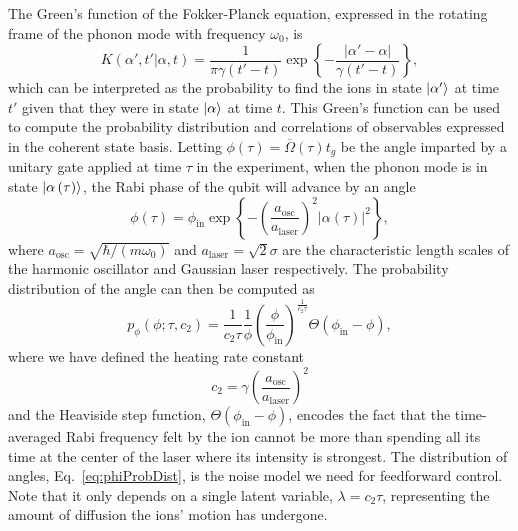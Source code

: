 \documentclass[prx,aps,twocolumn,showpacs,superscriptaddress,10pt]{revtex4-1}
\begin{document}
The Green's function of the Fokker-Planck equation, expressed in the rotating frame of the phonon mode with frequency $\omega_0$, is
\begin{equation}\label{eq:FPGreensFunc}
	K\left(\alpha', t' \lvert \alpha,t\right) = \frac{1}{\pi\gamma\left(t'-t\right)}\exp\left\{-\frac{\lvert \alpha'-\alpha\rvert}{\gamma\left(t'-t\right)}\right\},
\end{equation}
which can be interpreted as the probability to find the ions in state $\ket{\alpha'}$ at time $t'$ given that they were in state $\ket{\alpha}$ at time $t$. This Green's function can be used to compute the probability distribution and correlations of observables expressed in the coherent state basis. Letting $\phi\left(\tau\right)=\overline{\Omega}\left(\tau\right)t_{g}$ be the angle imparted by a unitary gate applied at time $\tau$ in the experiment, when the phonon mode is in state $\ket{\alpha\left(\tau\right)}$, the Rabi phase of the qubit will advance by an angle
\begin{equation}\label{eq:avgPhi}
	\phi\left(\tau\right)=\phi_\textrm{in}\exp\left\{-\left(\frac{a_\textrm{osc}}{a_\textrm{laser}}\right)^{2}\lvert\alpha\left(\tau\right)\rvert^{2}\right\},
\end{equation}
where $a_\textrm{osc}=\sqrt{\hbar/(m\omega_{0})}$ and $a_\textrm{laser}=\sqrt{2}\sigma$ are the characteristic length scales of the harmonic oscillator and Gaussian laser respectively. The probability distribution of the angle can then be computed as
\begin{equation}\label{eq:phiProbDist}
	p_{\phi}\left(\phi;\tau,c_{2}\right)=\frac{1}{c_{2}\tau}\frac{1}{\phi}\left(\frac{\phi}{\phi_\textrm{in}}\right)^{\frac{1}{c_{2}\tau}}\Theta\left(\phi_\textrm{in}-\phi\right),
\end{equation}
where we have defined the heating rate constant 
\begin{equation}\label{eq:c2}
	c_{2}=\gamma\left(\frac{a_\textrm{osc}}{a_\textrm{laser}}\right)^{2}
\end{equation}
and the Heaviside step function, $\Theta\left(\phi_\textrm{in}-\phi\right)$, encodes the fact that the time-averaged Rabi frequency felt by the ion cannot be more than spending all its time at the center of the laser where its intensity is strongest. The distribution of angles, Eq.~\eqref{eq:phiProbDist}, is the noise model we need for feedforward control. Note that it only depends on a single latent variable, $\lambda=c_{2}\tau$, representing the amount of diffusion the ions' motion has undergone.
\end{document}
